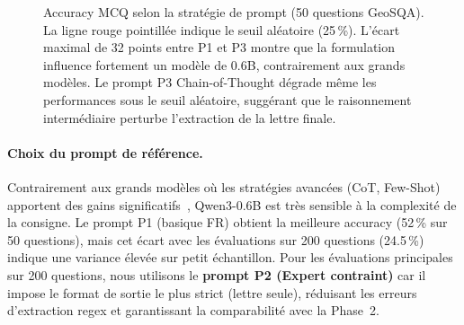 \documentclass[12pt,a4paper]{article}
\begin{document}
\begin{figure}[H]
\centering
{}
\caption{Accuracy MCQ selon la stratégie de prompt (50 questions GeoSQA). La ligne rouge pointillée indique le seuil aléatoire (25\,\%). L'écart maximal de 32 points entre P1 et P3 montre que la formulation influence fortement un modèle de 0.6B, contrairement aux grands modèles. Le prompt P3 Chain-of-Thought dégrade même les performances sous le seuil aléatoire, suggérant que le raisonnement intermédiaire perturbe l'extraction de la lettre finale.}
\label{fig:prompt_stability}
\end{figure}

\paragraph{Choix du prompt de référence.}
Contrairement aux grands modèles où les stratégies avancées (CoT, Few-Shot)
apportent des gains significatifs~\cite{wei_chain--thought_2022}, Qwen3-0.6B
est très sensible à la complexité de la consigne. Le prompt P1 (basique FR)
obtient la meilleure accuracy (52\,\% sur 50 questions), mais cet écart avec
les évaluations sur 200 questions (24.5\,\%) indique une variance élevée sur
petit échantillon. Pour les évaluations principales sur 200 questions, nous
utilisons le \textbf{prompt P2 (Expert contraint)} car il impose le format de
sortie le plus strict (lettre seule), réduisant les erreurs d'extraction regex
et garantissant la comparabilité avec la Phase~2.
\end{document}
